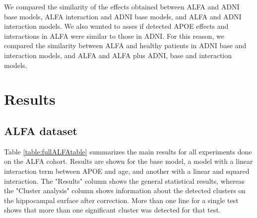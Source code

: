 We compared the similarity of the effects obtained between ALFA and ADNI base models, ALFA interaction and ADNI base models, and ALFA and ADNI interaction models. We also wanted to asses if detected APOE effects and interactions in ALFA were similar to those in ADNI. For this reason, we compared the similarity between ALFA and healthy patients in ADNI base and interaction models, and ALFA and ALFA plus ADNI, base and interaction models.

\section{Results}
\label{sec:results}

\subsection{ALFA dataset}

Table \ref{table:fullALFAtable} summarizes the main results for all experiments done on the ALFA cohort. Results are shown for the base model, a model with a linear interaction term between APOE and age, and another with a linear and squared interaction. The "Results" column shows the general statistical results, whereas the "Cluster analysis" column shows information about the detected clusters on the hippocampal surface after correction. More than one line for a single test shows that more than one significant cluster was detected for that test. \\


